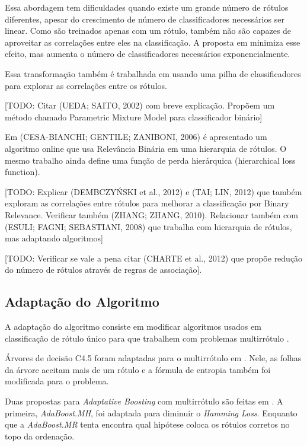 \documentclass[runningheads,a4paper]{llncs}
\begin{document}
Essa abordagem tem dificuldades quando existe um grande número de rótulos diferentes, apesar do crescimento de número de classificadores necessários ser linear. Como são treinados apenas com um rótulo, também não são capazes de aproveitar as correlações entre eles na classificação. A proposta em \cite{Hullermeier2008-co} minimiza esse efeito, mas aumenta o número de classificadores necessários exponencialmente.

Essa transformação também é trabalhada em \cite{Tsoumakas2009-ex} usando uma pilha de classificadores para explorar as correlações entre os rótulos.

[TODO: Citar (UEDA; SAITO, 2002)\cite{Ueda2002-gd} com breve explicação. Propõem um método chamado Parametric Mixture Model para classificador binário]

Em (CESA-BIANCHI; GENTILE; ZANIBONI, 2006) \cite{Cesa-Bianchi2006-fk} é apresentado um algoritmo online que usa Relevância Binária em uma hierarquia de rótulos. O mesmo trabalho ainda define uma função de perda hierárquica (hierarchical loss function).

[TODO: Explicar (DEMBCZYŃSKI et al., 2012)\cite{Dembczynski2012-tv} e (TAI; LIN, 2012)\cite{Tai2012-xa} que também exploram as correlações entre rótulos para melhorar a classificação por Binary Relevance. Verificar também (ZHANG; ZHANG, 2010)\cite{Zhang2010-ee}. Relacionar também com (ESULI; FAGNI; SEBASTIANI, 2008) \cite{Esuli2008-on} que trabalha com hierarquia de rótulos, mas adaptando algoritmos]

[TODO: Verificar se vale a pena citar (CHARTE et al., 2012)\cite{Charte2012-tw} que propõe redução do número de rótulos através de regras de associação].

\subsection{Adaptação do Algoritmo}\label{subsec:adaptacao}

A adaptação do algoritmo consiste em modificar algoritmos usados em classificação de rótulo único para que trabalhem com problemas multirrótulo \cite{Tsoumakas2007-cw}.

Árvores de decisão C4.5 foram adaptadas para o multirrótulo em \cite{Clare2001-tq}. Nele, as folhas da árvore aceitam mais de um rótulo e a fórmula de entropia também foi modificada para o problema.

Duas propostas para \textit{Adaptative Boosting} com multirrótulo são feitas em \cite{Schapire2000-yt}. A primeira, \textit{AdaBoost.MH}, foi adaptada para diminuir o \textit{Hamming Loss}. Enquanto que a \textit{AdaBoost.MR} tenta encontra qual hipótese coloca os rótulos corretos no topo da ordenação.
\end{document}
